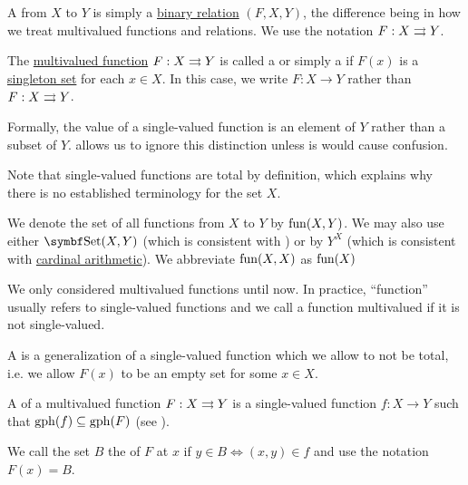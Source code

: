 \begin{definition}\label{def:function}
  A  from \( X \) to \( Y \) is simply a \hyperref[def:binary_relation]{binary relation} \( (F, X, Y) \), the difference being in how we treat multivalued functions and relations. We use the notation \( F: X \rightrightarrows Y \).

  \begin{DefEnum}[series=def:function]
     The \hyperref[def:function/multivalued]{multivalued function} \( F: X \rightrightarrows Y \) is called a  or simply a  if \( F(x) \) is a \hyperref[remark:singleton_sets]{singleton set} for each \( x \in X \). In this case, we write \( F: X \to Y \) rather than \( F: X \rightrightarrows Y \).

    Formally, the value of a single-valued function is an element of \( Y \) rather than a subset of \( Y \).  allows us to ignore this distinction unless is would cause confusion.

    Note that single-valued functions are total by definition, which explains why there is no established terminology for the set \( X \).

    We denote the set of all functions from \( X \) to \( Y \) by \( \operatorname{fun}(X, Y) \). We may also use either \( \Cat{Set}(X, Y) \) (which is consistent with ) or by \( Y^X \) (which is consistent with \hyperref[def:cardinal_arithmetic]{cardinal arithmetic}). We abbreviate \( \operatorname{fun}(X, X) \) as \( \operatorname{fun}(X) \)

     We only considered multivalued functions until now. In practice, \enquote{function} usually refers to single-valued functions and we call a function multivalued if it is not single-valued.

     A  is a generalization of a single-valued function which we allow to not be total, i.e. we allow \( F(x) \) to be an empty set for some \( x \in X \).

     A  of a multivalued function \( F: X \rightrightarrows Y \) is a single-valued function \( f: X \to Y \) such that \( \operatorname{gph}(f) \subseteq \operatorname{gph}(F) \) (see ).

     We call the set \( B \) the  of \( F \) at \( x \) if \( y \in B \iff (x, y) \in f \) and use the notation \( F(x) = B \).


\end{DefEnum}
\end{definition}
